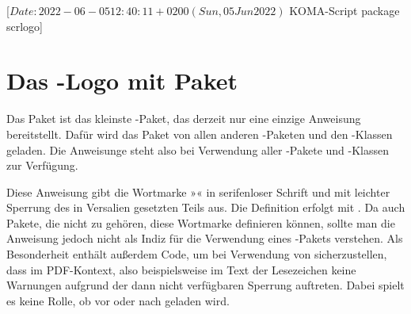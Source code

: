 %
%
%
%
%
%
%

                 [$Date: 2022-06-05 12:40:11 +0200 (Sun, 05 Jun 2022) $
                  KOMA-Script package scrlogo]

\chapter{Das \KOMAScript-Logo mit Paket }
\BeginIndexGroup
{}%

Das Paket  ist das kleinste \KOMAScript-Paket, das derzeit
nur eine einzige Anweisung bereitstellt. Dafür wird das Paket von allen anderen
\KOMAScript-Paketen und den \KOMAScript-Klassen geladen. Die Anweisunge steht
also bei Verwendung aller \KOMAScript-Pakete und \KOMAScript-Klassen zur
Verfügung.

\begin{Declaration}
\end{Declaration}
Diese Anweisung gibt die Wortmarke »\KOMAScript« in serifenloser Schrift und
mit leichter Sperrung des in Versalien gesetzten Teils aus. Die Definition
erfolgt mit . Da auch Pakete, die nicht zu
\KOMAScript{} gehören, diese Wortmarke definieren können, sollte man die
Anweisung jedoch nicht als Indiz für die Verwendung eines \KOMAScript-Pakets
verstehen. Als Besonderheit enthält
 außerdem Code, um bei Verwendung von
sicherzustellen, dass im PDF-Kontext, also beispielsweise im Text der
Lesezeichen keine Warnungen aufgrund der dann nicht verfügbaren Sperrung
auftreten. Dabei spielt es keine Rolle, ob  vor oder nach
 geladen wird.%
\EndIndexGroup
\EndIndexGroup
\endinput
                  
